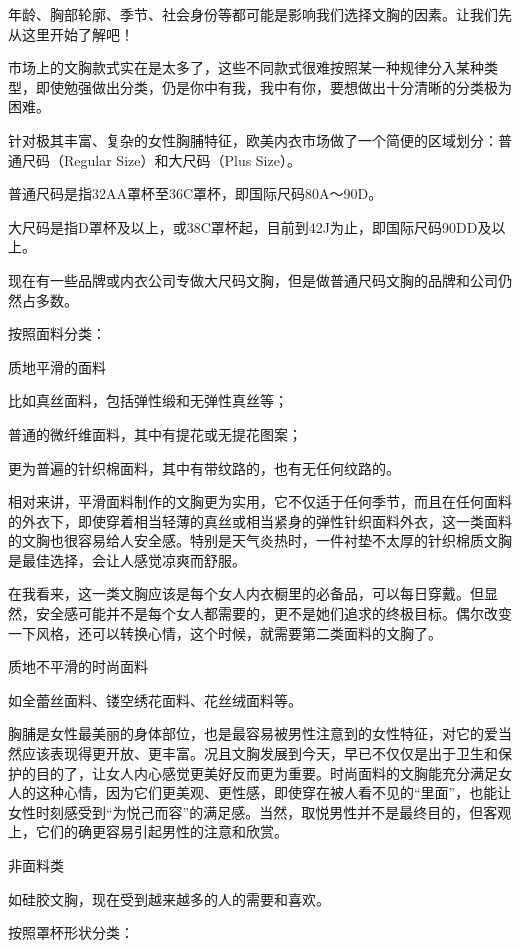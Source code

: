 \documentclass[12pt,UTF8]{ctexbook}
\begin{document}
年龄、胸部轮廓、季节、社会身份等都可能是影响我们选择文胸的因素。让我们先从这里开始了解吧！



市场上的文胸款式实在是太多了，这些不同款式很难按照某一种规律分入某种类型，即使勉强做出分类，仍是你中有我，我中有你，要想做出十分清晰的分类极为困难。


针对极其丰富、复杂的女性胸脯特征，欧美内衣市场做了一个简便的区域划分：普通尺码（Regular Size）和大尺码（Plus Size）。

普通尺码是指32AA罩杯至36C罩杯，即国际尺码80A～90D。

大尺码是指D罩杯及以上，或38C罩杯起，目前到42J为止，即国际尺码90DD及以上。

现在有一些品牌或内衣公司专做大尺码文胸，但是做普通尺码文胸的品牌和公司仍然占多数。

按照面料分类：

质地平滑的面料



比如真丝面料，包括弹性缎和无弹性真丝等；

普通的微纤维面料，其中有提花或无提花图案；

更为普遍的针织棉面料，其中有带纹路的，也有无任何纹路的。

相对来讲，平滑面料制作的文胸更为实用，它不仅适于任何季节，而且在任何面料的外衣下，即使穿着相当轻薄的真丝或相当紧身的弹性针织面料外衣，这一类面料的文胸也很容易给人安全感。特别是天气炎热时，一件衬垫不太厚的针织棉质文胸是最佳选择，会让人感觉凉爽而舒服。

在我看来，这一类文胸应该是每个女人内衣橱里的必备品，可以每日穿戴。但显然，安全感可能并不是每个女人都需要的，更不是她们追求的终极目标。偶尔改变一下风格，还可以转换心情，这个时候，就需要第二类面料的文胸了。

质地不平滑的时尚面料

如全蕾丝面料、镂空绣花面料、花丝绒面料等。



胸脯是女性最美丽的身体部位，也是最容易被男性注意到的女性特征，对它的爱当然应该表现得更开放、更丰富。况且文胸发展到今天，早已不仅仅是出于卫生和保护的目的了，让女人内心感觉更美好反而更为重要。时尚面料的文胸能充分满足女人的这种心情，因为它们更美观、更性感，即使穿在被人看不见的“里面”，也能让女性时刻感受到“为悦己而容”的满足感。当然，取悦男性并不是最终目的，但客观上，它们的确更容易引起男性的注意和欣赏。

非面料类

如硅胶文胸，现在受到越来越多的人的需要和喜欢。

按照罩杯形状分类：
\end{document}
